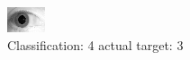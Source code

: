 \begin{figure}[h!]
\begin{center}
\includegraphics[width=0.60\columnwidth]{figures/ID1852_class_4_target_3.png}
\end{center}
\caption{ Classification: 4 actual target: 3}
\label{fig:ID1852_class_4_target_3}
\end{figure}
